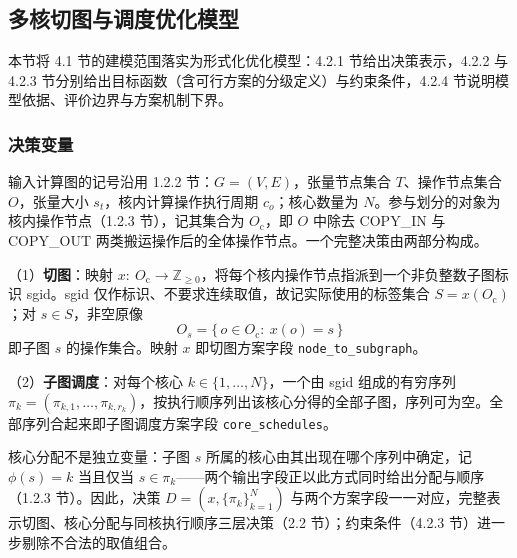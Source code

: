 \subsection{多核切图与调度优化模型}\label{sec:q1-model}
本节将 4.1 节的建模范围落实为形式化优化模型：4.2.1 节给出决策表示，4.2.2 与 4.2.3 节分别给出目标函数（含可行方案的分级定义）与约束条件，4.2.4 节说明模型依据、评价边界与方案机制下界。

\subsubsection{决策变量}\label{sec:q1-vars}
输入计算图的记号沿用 1.2.2 节：$G=(V,E)$，张量节点集合 $T$、操作节点集合 $O$，张量大小 $s_t$，核内计算操作执行周期 $c_o$；核心数量为 $N$。参与划分的对象为核内操作节点（1.2.3 节），记其集合为 $O_{\mathrm{c}}$，即 $O$ 中除去 COPY\_IN 与 COPY\_OUT 两类搬运操作后的全体操作节点。一个完整决策由两部分构成。

（1）\textbf{切图}：映射 $x:\ O_{\mathrm{c}}\rightarrow\mathbb{Z}_{\ge 0}$，将每个核内操作节点指派到一个非负整数子图标识 sgid。sgid 仅作标识、不要求连续取值，故记实际使用的标签集合 $S=x(O_{\mathrm{c}})$；对 $s\in S$，非空原像
\[
O_s=\{\,o\in O_{\mathrm{c}}:\ x(o)=s\,\}
\]
即子图 $s$ 的操作集合。映射 $x$ 即切图方案字段 \texttt{node\_to\_subgraph}。

（2）\textbf{子图调度}：对每个核心 $k\in\{1,\dots,N\}$，一个由 sgid 组成的有穷序列 $\pi_k=(\pi_{k,1},\dots,\pi_{k,r_k})$，按执行顺序列出该核心分得的全部子图，序列可为空。全部序列合起来即子图调度方案字段 \texttt{core\_schedules}。

核心分配不是独立变量：子图 $s$ 所属的核心由其出现在哪个序列中确定，记 $\phi(s)=k$ 当且仅当 $s\in\pi_k$——两个输出字段正以此方式同时给出分配与顺序（1.2.3 节）。因此，决策 $D=(x,\{\pi_k\}_{k=1}^{N})$ 与两个方案字段一一对应，完整表示切图、核心分配与同核执行顺序三层决策（2.2 节）；约束条件（4.2.3 节）进一步剔除不合法的取值组合。

